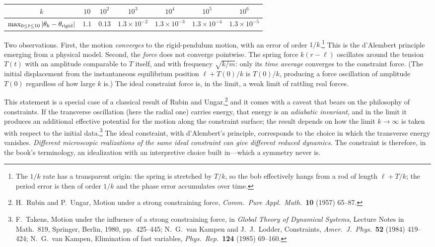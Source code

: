 \begin{center}
\begin{tabular}{c|cccccc}
$k$ & $10$ & $10^2$ & $10^3$ & $10^4$ & $10^5$ & $10^6$\\ \hline
$\max_{0\le t\le10}|\theta_k-\theta_{\rm rigid}|$ & $1.1$ & $0.13$ & $1.3\times10^{-2}$ & $1.3\times10^{-3}$ & $1.3\times10^{-4}$ & $1.3\times10^{-5}$
\end{tabular}
\end{center}

Two observations. First, the motion \emph{converges} to the rigid-pendulum motion, with an error of order $1/k$.\footnote{The $1/k$ rate has a transparent origin: the spring is stretched by $T/k$, so the bob effectively hangs from a rod of length $\ell+T/k$; the period error is then of order $1/k$ and the phase error accumulates over time.} This is the d'Alembert principle emerging from a physical model. Second, the \emph{force} does not converge pointwise. The spring force $k(r-\ell)$ oscillates around the tension $T(t)$ with an amplitude comparable to $T$ itself, and with frequency $\sqrt{k/m}$: only its \emph{time average} converges to the constraint force. (The initial displacement from the instantaneous equilibrium position $\ell+T(0)/k$ is $T(0)/k$, producing a force oscillation of amplitude $T(0)$ regardless of how large $k$ is.) The ideal constraint force is, in the limit, a weak limit of rattling real forces.

This statement is a special case of a classical result of Rubin and Ungar,\footnote{H.\ Rubin and P.\ Ungar, Motion under a strong constraining force, \emph{Comm.\ Pure Appl.\ Math.}\ \textbf{10} (1957) 65--87.} and it comes with a caveat that bears on the philosophy of constraints. If the transverse oscillation (here the radial one) carries energy, that energy is an \emph{adiabatic invariant}, and in the limit it produces an additional effective potential for the motion along the constraint surface; the result depends on how the limit $k\to\infty$ is taken with respect to the initial data.\footnote{F.\ Takens, Motion under the influence of a strong constraining force, in \emph{Global Theory of Dynamical Systems}, Lecture Notes in Math.\ 819, Springer, Berlin, 1980, pp.\ 425--445; N.\ G.\ van Kampen and J.\ J.\ Lodder, Constraints, \emph{Amer.\ J.\ Phys.}\ \textbf{52} (1984) 419--424; N.\ G.\ van Kampen, Elimination of fast variables, \emph{Phys.\ Rep.}\ \textbf{124} (1985) 69--160.} The ideal constraint, with d'Alembert's principle, corresponds to the choice in which the transverse energy vanishes. \emph{Different microscopic realizations of the same ideal constraint can give different reduced dynamics.} The constraint is therefore, in the book's terminology, an idealization with an interpretive choice built in---which a symmetry never is.

